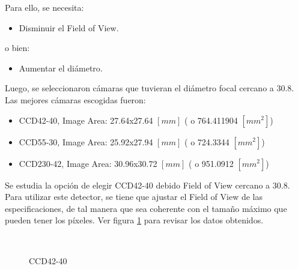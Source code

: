 \documentclass[a4paper,10pt]{article}
\begin{document}
Para ello, se necesita:
\begin{itemize}
\item Disminuir el Field of View.
\end{itemize}
o bien:
\begin{itemize}
\item Aumentar el diámetro.
\end{itemize}

Luego, se seleccionaron cámaras que tuvieran el diámetro focal cercano a 30.8.
Las mejores cámaras escogidas fueron:
\begin{itemize}
\item CCD42-40,  Image Area: 27.64x27.64 $[mm]$ ( o 764.411904 $[mm^2]$)
\item CCD55-30,  Image Area: 25.92x27.94 $[mm]$ ( o 724.3344   $[mm^2]$)
\item CCD230-42, Image Area: 30.96x30.72 $[mm]$ ( o 951.0912   $[mm^2]$)
\end{itemize}
Se estudia la opción de elegir CCD42-40 debido Field of View cercano a 30.8.
Para utilizar este detector, se tiene que ajustar el Field of View de las
especificaciones, de tal manera que sea coherente con el tamaño máximo que
pueden tener los píxeles.  Ver figura \ref{fig:ccd42p2} para revisar los datos
obtenidos.
\begin{figure}[ht!]
  \centering
  ~ 
  ~ 
  \caption{CCD42-40}
  \label{fig:ccd42p2}
\end{figure}
\end{document}
